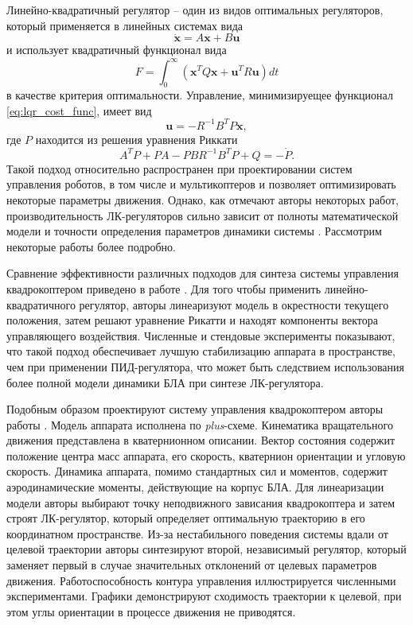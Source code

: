 Линейно-квадратичный регулятор -- один из видов оптимальных регуляторов, который применяется в линейных системах вида
\begin{equation} \label{eq:linear_dyn_system}
\dot{\bm{x}} = A\bm{x} + B\bm{u}
\end{equation}
и  использует квадратичный функционал вида
	\begin{equation} \label{eq:lqr_cost_func}
	F = \int_0^{\infty}{(\bm{x}^T Q \bm{x} + \bm{u}^T R \bm{u})} dt
	\end{equation}
в качестве критерия оптимальности. Управление, минимизируещее функционал \eqref{eq:lqr_cost_func}, имеет вид \cite{Letov01}
	\begin{equation} \label{eq:lqr_control_law}
	\bm{u} = -R^{-1} B^T P \bm{x},
	\end{equation}
где $P$ находится из решения уравнения Риккати
	\begin{equation} \label{eq:riqatty}
	A^T P + P A - P B R^{-1} B^T P + Q = -\dot{P}.
	\end{equation}
Такой подход относительно распространен при проектировании систем управления роботов, в том числе и мультикоптеров \cite{Baklanov01, Muhhamid01, Argentim01} и позволяет оптимизировать некоторые параметры движения. Однако, как отмечают авторы некоторых работ, производительность ЛК-регуляторов сильно зависит от полноты математической модели и точности определения параметров динамики системы \cite{Kim01, Joukhadar01}. Рассмотрим некоторые работы более подробно.

Сравнение эффективности различных подходов для синтеза системы управления квадрокоптером приведено в работе \cite{Bouabdallah01}. Для того чтобы применить линейно-квадратичного регулятор, авторы линеаризуют модель в окрестности текущего положения, затем решают уравнение Рикатти и находят компоненты вектора управляющего воздействия.
Численные и стендовые эксперименты показывают, что такой подход обеспечивает лучшую стабилизацию аппарата в пространстве, чем при применении ПИД-регулятора, что может быть следствием использования более полной модели динамики БЛА при синтезе ЛК-регулятора.

Подобным образом проектируют систему управления квадрокоптером авторы работы \cite{Reyes-Valeria01}. Модель аппарата исполнена по \textit{plus}-схеме. Кинематика вращательного движения представлена в кватернионном описании. Вектор состояния содержит положение центра масс аппарата, его скорость, кватернион ориентации и угловую скорость. Динамика аппарата, помимо стандартных сил и моментов, содержит аэродинамические моменты, действующие на корпус БЛА. Для линеаризации модели авторы выбирают точку неподвижного зависания квадрокоптера и затем строят ЛК-регулятор, который определяет оптимальную траекторию в его координатном пространстве. Из-за нестабильного поведения системы вдали от целевой траектории авторы синтезируют второй, независимый регулятор, который заменяет первый в случае значительных отклонений от целевых параметров движения. Работоспособность контура управления иллюстрируется численными экспериментами. Графики демонстрируют сходимость траектории к целевой, при этом углы ориентации в процессе движения не приводятся.

